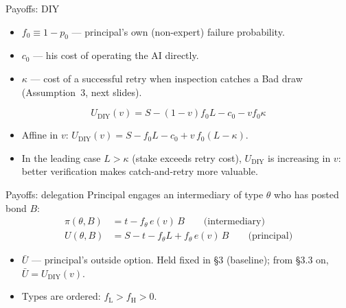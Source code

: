 \documentclass[11pt,aspectratio=169]{beamer}
\newcommand{\fH}{f_{\mathrm{H}}}
\newcommand{\fL}{f_{\mathrm{L}}}
\newcommand{\Ubar}{\bar U}
\newcommand{\UDIY}{U_{\mathrm{DIY}}}
\begin{document}
\begin{frame}{Payoffs: DIY}
\begin{itemize}
  \item $f_0\equiv1-p_0$ --- principal's own (non-expert) failure probability.
  \item $c_0$ --- his cost of operating the AI directly.
  \item $\kappa$ --- cost of a successful retry when inspection catches a Bad draw (Assumption~3, next slides).
\end{itemize}
\vfill
\begin{equation*}
  \UDIY(v) = S-(1-v)f_0L-c_0-vf_0\kappa
\end{equation*}
\vfill
\begin{itemize}
  \item Affine in $v$: $\UDIY(v)=S-f_0L-c_0+v\,f_0(L-\kappa)$.
  \item In the leading case $L>\kappa$ (stake exceeds retry cost), $\UDIY$ is \alert{increasing} in $v$: better verification makes catch-and-retry more valuable.
\end{itemize}
\end{frame}

\begin{frame}{Payoffs: delegation}
Principal engages an intermediary of type $\theta$ who has posted bond $B$:
\begin{align*}
  \pi(\theta,B) &= t - f_\theta\, e(v)\, B \qquad\text{(intermediary)} \\[4pt]
  U(\theta,B) &= S-t-f_\theta L + f_\theta\, e(v)\, B \qquad\text{(principal)}
\end{align*}
\vfill
\begin{itemize}
  \item $\Ubar$ --- principal's outside option. Held fixed in \S3 (baseline); from \S3.3 on, $\Ubar=\UDIY(v)$.
  \item Types are ordered: $\fL>\fH>0$.
\end{itemize}
\end{frame}
\end{document}
